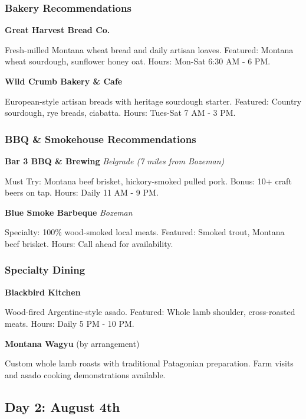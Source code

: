\documentclass[
  11pt,
  letterpaper,
  DIV=10,
  numbers=noendperiod]{scrartcl}
\begin{document}
\subsubsection{Bakery Recommendations}\label{bakery-recommendations}

\textbf{Great Harvest Bread Co.}

Fresh-milled Montana wheat bread and daily artisan loaves. Featured:
Montana wheat sourdough, sunflower honey oat. Hours: Mon-Sat 6:30 AM - 6
PM.

\textbf{Wild Crumb Bakery \& Cafe}

European-style artisan breads with heritage sourdough starter. Featured:
Country sourdough, rye breads, ciabatta. Hours: Tues-Sat 7 AM - 3 PM.

\subsubsection{BBQ \& Smokehouse
Recommendations}\label{bbq-smokehouse-recommendations}

\textbf{Bar 3 BBQ \& Brewing} \textbar{} \emph{Belgrade (7 miles from
Bozeman)}

Must Try: Montana beef brisket, hickory-smoked pulled pork. Bonus: 10+
craft beers on tap. Hours: Daily 11 AM - 9 PM.

\textbf{Blue Smoke Barbeque} \textbar{} \emph{Bozeman}

Specialty: 100\% wood-smoked local meats. Featured: Smoked trout,
Montana beef brisket. Hours: Call ahead for availability.

\subsubsection{Specialty Dining}\label{specialty-dining}

\textbf{Blackbird Kitchen}

Wood-fired Argentine-style asado. Featured: Whole lamb shoulder,
cross-roasted meats. Hours: Daily 5 PM - 10 PM.

\textbf{Montana Wagyu} (by arrangement)

Custom whole lamb roasts with traditional Patagonian preparation. Farm
visits and asado cooking demonstrations available.

\subsection{Day 2: August 4th}\label{day-2-august-4th}
\end{document}
